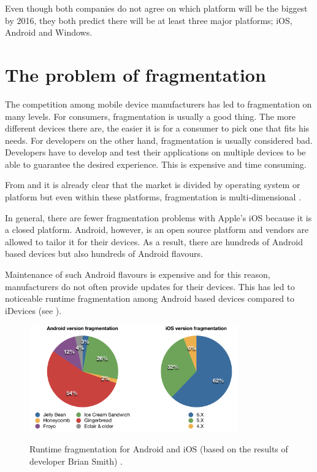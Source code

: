 \npar Even though both companies do not agree on which platform will be the biggest by 2016, they both predict there will be at least three major platforms; iOS, Android and Windows. 


\section{The problem of fragmentation}

\npar The competition among mobile device manufacturers has led to fragmentation on many levels. For consumers, fragmentation is usually a good thing. The more different devices there are, the easier it is for a consumer to pick one that fits his needs. For developers on the other hand, fragmentation is usually considered bad. Developers have to develop and test their applications on multiple devices to be able to guarantee the desired experience. This is expensive and time consuming.

\npar From  and  it is already clear that the market is divided by operating system or platform but even within these platforms, fragmentation is multi-dimensional \citep{kindel}.

\npar In general, there are fewer fragmentation problems with Apple's iOS because it is a closed platform. Android, however, is an open source platform and vendors are allowed to tailor it for their devices. As a result, there are hundreds of Android based devices but also hundreds of Android flavours.

\npar Maintenance of such Android flavours is expensive and for this reason, manufacturers do not often provide updates for their devices. This has led to noticeable runtime fragmentation among Android based devices compared to iDevices (see ). 

\begin{figure}
    \begin{center}
        \label{fig:runtime_fragmentation}
        \includegraphics[width=0.8\textwidth]{figs/os_distribution.pdf}
        \caption{
            Runtime fragmentation for Android \citep{android_distribution} and iOS (based on the results of developer Brian Smith) \citep{ios_distribution}.
        }
    \end{center}
\end{figure}

